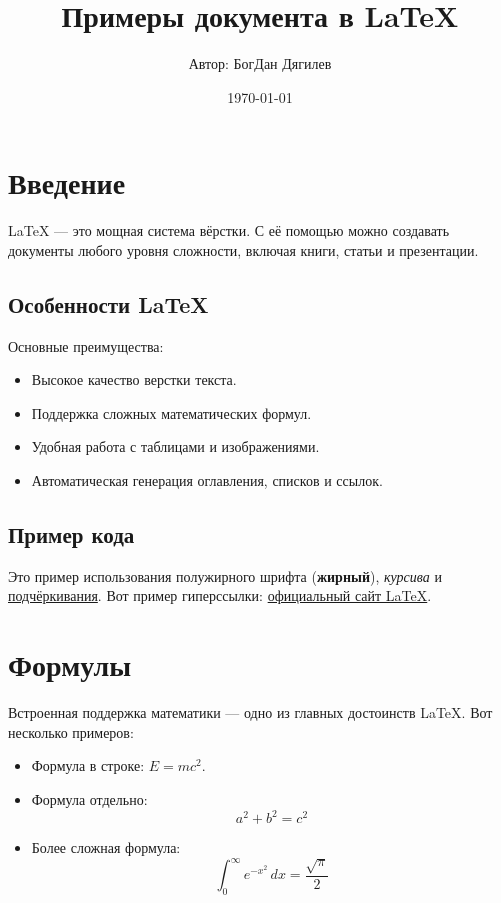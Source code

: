 \documentclass[a4paper, 12pt]{extarticle}
\title{Примеры документа в LaTeX}
\author{Автор: БогДан Дягилев}
\date{\today}
\begin{document}
\maketitle %
\tableofcontents %
\newpage

\section{Введение}
LaTeX — это мощная система вёрстки. С её помощью можно создавать документы любого уровня сложности, включая книги, статьи и презентации.

\subsection{Особенности LaTeX}

Основные преимущества:
\begin{itemize}
    \item Высокое качество верстки текста.
    \item Поддержка сложных математических формул.
    \item Удобная работа с таблицами и изображениями.
    \item Автоматическая генерация оглавления, списков и ссылок.
\end{itemize}

\subsection{Пример кода}

Это пример использования полужирного шрифта (\textbf{жирный}), \textit{курсива} и \underline{подчёркивания}. Вот пример гиперссылки: \href{https://www.latex-project.org}{официальный сайт LaTeX}.

\section{Формулы}

Встроенная поддержка математики — одно из главных достоинств LaTeX. Вот несколько примеров:
\begin{itemize}
    \item Формула в строке: \(E = mc^2\).
    \item Формула отдельно:
          \[
              a^2 + b^2 = c^2
          \]
    \item Более сложная формула:
          \[
              \int_{0}^{\infty} e^{-x^2} \, dx = \frac{\sqrt{\pi}}{2}
          \]
\end{itemize}
\end{document}
